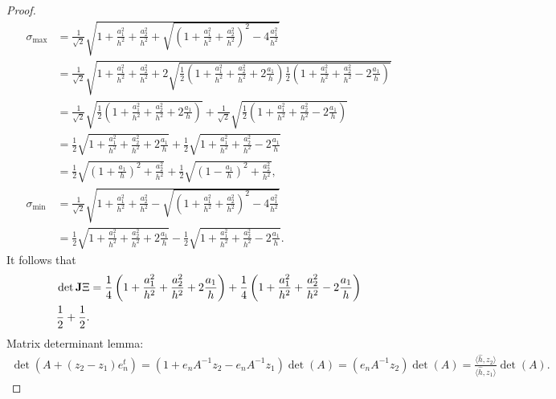 \documentclass[10pt,a4paper]{article}
\begin{document}
\begin{proof}
    \begin{align*}
        \sigma_{\max}
        &= 
        \frac{1}{\sqrt 2}
        \sqrt{ 1 + \frac{ a_1^2 }{h^2} + \frac{ a_2^2 }{h^2} + \sqrt{ \left( 1 + \frac{ a_1^2 }{h^2} + \frac{ a_2^2 }{h^2} \right)^2 - 4 \frac{ a_1^2 }{h^2} } }
        \\&= 
        \frac{1}{\sqrt 2}
        \sqrt{ 1 + \frac{ a_1^2 }{h^2} + \frac{ a_2^2 }{h^2} + 2\sqrt{ 
            \frac 1 2 \left( 1 + \frac{ a_1^2 }{h^2} + \frac{ a_2^2 }{h^2} + 2\frac{ a_1 }{h} \right)
            \frac 1 2 \left( 1 + \frac{ a_1^2 }{h^2} + \frac{ a_2^2 }{h^2} - 2\frac{ a_1 }{h} \right)
            } }
        \\&= 
        \frac{1}{\sqrt 2}
        \sqrt{ 
            \frac 1 2 \left( 1 + \frac{ a_1^2 }{h^2} + \frac{ a_2^2 }{h^2} + 2\frac{ a_1 }{h} \right)
            }
        +
        \frac{1}{\sqrt 2}
        \sqrt{ 
            \frac 1 2 \left( 1 + \frac{ a_1^2 }{h^2} + \frac{ a_2^2 }{h^2} - 2\frac{ a_1 }{h} \right)
            }
        \\&= 
        \frac{1}{2}
        \sqrt{ 
            1 + \frac{ a_1^2 }{h^2} + \frac{ a_2^2 }{h^2} + 2\frac{ a_1 }{h}
            }
        +
        \frac{1}{2}
        \sqrt{ 
            1 + \frac{ a_1^2 }{h^2} + \frac{ a_2^2 }{h^2} - 2\frac{ a_1 }{h}
            }
        \\&= 
        \frac{1}{2}
        \sqrt{ 
            \left( 1 + \frac{ a_1 }{h} \right)^{2} + \frac{ a_2^2 }{h^2}
            }
        +
        \frac{1}{2}
        \sqrt{ 
            \left( 1 - \frac{ a_1 }{h} \right)^{2} + \frac{ a_2^2 }{h^2}
            }
        ,
        \\
        \sigma_{\min}
        &=
        \frac{1}{\sqrt 2}
        \sqrt{ 1 + \frac{ a_1^2 }{h^2} + \frac{ a_2^2 }{h^2} - \sqrt{ \left( 1 + \frac{ a_1^2 }{h^2} + \frac{ a_2^2 }{h^2} \right)^2 - 4 \frac{ a_1^2 }{h^2} } }
        \\&= 
        \frac{1}{2}
        \sqrt{ 
            1 + \frac{ a_1^2 }{h^2} + \frac{ a_2^2 }{h^2} + 2\frac{ a_1 }{h}
            }
        -
        \frac{1}{2}
        \sqrt{ 
            1 + \frac{ a_1^2 }{h^2} + \frac{ a_2^2 }{h^2} - 2\frac{ a_1 }{h}
            }
        .
    \end{align*}
    It follows that 
    \begin{align*}
        \det {\mathbf{J}}\Xi
        &=
        \frac{1}{4}
        \left( 1 + \frac{ a_1^2 }{h^2} + \frac{ a_2^2 }{h^2} + 2\frac{ a_1 }{h} \right)
        +
        \frac{1}{4}
        \left( 1 + \frac{ a_1^2 }{h^2} + \frac{ a_2^2 }{h^2} - 2\frac{ a_1 }{h} \right)
        \\
        \frac{1}{2} + \frac{1}{2} 
        .
    \end{align*}
    Matrix determinant lemma:
    \begin{align*}
        \det( A + (z_2-z_1) e_n^t ) = \left( 1 + e_n A^{-1} z_2 - e_n A^{-1} z_1 \right) \det(A)
        =
        \left( e_{n} A^{-1} z_2 \right) \det(A)
        =
        \frac{\langle \hat h, z_2 \rangle}{\langle \hat h, z_1 \rangle} \det(A)
        .
    \end{align*}
\end{proof}
\end{document}
